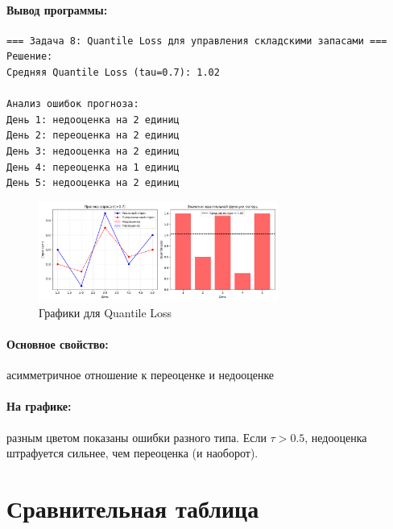 \documentclass[12pt]{article}
\theoremstyle{definition}
\theoremstyle{definition}
\theoremstyle{definition}
\theoremstyle{remark}
\theoremstyle{remark}
\begin{document}
\paragraph{Вывод программы:}
\begin{verbatim}
=== Задача 8: Quantile Loss для управления складскими запасами ===
Решение:
Средняя Quantile Loss (tau=0.7): 1.02

Анализ ошибок прогноза:
День 1: недооценка на 2 единиц
День 2: переоценка на 2 единиц
День 3: недооценка на 2 единиц
День 4: переоценка на 1 единиц
День 5: недооценка на 2 единиц
\end{verbatim}

\begin{figure}[h!]
    \centering
    \includegraphics[width=0.7\textwidth]{imgs/quantile.png}
    \caption{Графики для Quantile Loss}
\end{figure}

\paragraph{Основное свойство:} асимметричное отношение к переоценке и недооценке

\paragraph{На графике:} разным цветом показаны ошибки разного типа. Если $\tau > 0.5$, недооценка штрафуется сильнее, чем переоценка (и наоборот).


\section{Сравнительная таблица}
\end{document}
